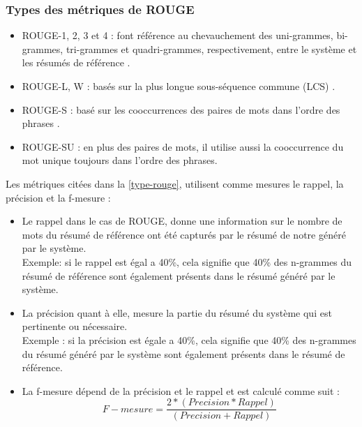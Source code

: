 \subsubsection{Types des métriques de ROUGE\label{type-rouge}}
\begin{itemize}
    \item{ROUGE-1, 2, 3 et 4 : font référence au chevauchement des uni-grammes, bi-grammes, tri-grammes et quadri-grammes, respectivement, entre le système et les résumés de référence \cite{rouge1}.}\\
    \item{ROUGE-L, W : basés sur la plus longue sous-séquence commune (LCS) \cite{rouge2}.}\\
    \item{ROUGE-S : basé sur les cooccurrences des paires de mots dans l'ordre des phrases \cite{rouge2}.}\\
    \item{ROUGE-SU : en plus des paires de mots, il utilise aussi la cooccurrence du mot unique toujours dans l'ordre des phrases.}
\end{itemize}

Les métriques citées dans la \autoref{type-rouge}, utilisent comme mesures le rappel, la précision et la f-mesure :  
\begin{itemize}
    
    \item {Le rappel dans le cas de ROUGE, donne une information sur le nombre de mots du résumé de référence ont été capturés par le résumé de notre généré par le système.\\ 
        Exemple: si le rappel est égal a 40\%, cela signifie que 40\% des n-grammes du résumé de référence sont également présents dans le résumé généré par le système.}\\
    \item {La précision quant à elle, mesure la partie du résumé du système qui est pertinente ou nécessaire.\\ 
        Exemple : si la précision est égale a 40\%, cela signifie que 40\% des n-grammes du résumé généré par le système sont également présents dans le résumé de référence.}
    \item {La f-mesure dépend de la précision et le rappel et est calculé comme suit :\\
                        \[ F-mesure = \frac{2 * (Precision * Rappel)} {(Precision + Rappel)} \]}

\end{itemize}




